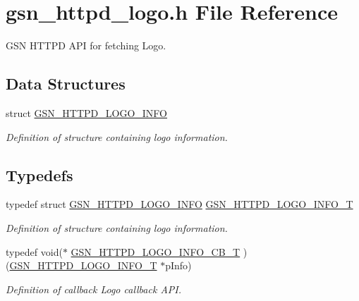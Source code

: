 \hypertarget{a00513}{
\section{gsn\_\-httpd\_\-logo.h File Reference}
\label{a00513}
}


GSN HTTPD API for fetching Logo.  


\subsection*{Data Structures}
\begin{DoxyCompactItemize}
\item 
struct \hyperlink{a00096}{GSN\_\-HTTPD\_\-LOGO\_\-INFO}
\begin{DoxyCompactList}\small\item\em Definition of structure containing logo information. \end{DoxyCompactList}\end{DoxyCompactItemize}
\subsection*{Typedefs}
\begin{DoxyCompactItemize}
\item 
typedef struct \hyperlink{a00096}{GSN\_\-HTTPD\_\-LOGO\_\-INFO} \hyperlink{a00513_a0e3e0804a968ae2e6454dd1dbbeedbc8}{GSN\_\-HTTPD\_\-LOGO\_\-INFO\_\-T}
\begin{DoxyCompactList}\small\item\em Definition of structure containing logo information. \end{DoxyCompactList}\item 
typedef void($\ast$ \hyperlink{a00513_aad62b44c06f9c4abc0073c0388cbe332}{GSN\_\-HTTPD\_\-LOGO\_\-INFO\_\-CB\_\-T} )(\hyperlink{a00096}{GSN\_\-HTTPD\_\-LOGO\_\-INFO\_\-T} $\ast$pInfo)
\begin{DoxyCompactList}\small\item\em Definition of callback Logo callback API. \end{DoxyCompactList}\end{DoxyCompactItemize}

